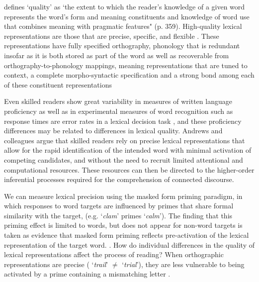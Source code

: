 \documentclass[review]{elsarticle}
\begin{document}
\citet{perfettiReadingAbilityLexical2007} defines `quality'  as `the extent to which the reader's knowledge of a given word represents the word's form and meaning constituents and knowledge of word use that combines meaning with pragmatic features" (p. 359). High-quality lexical representations are those that are  precise, specific, and flexible \citep{perfettiReadingAbilityLexical2007}.  These representations have fully specified orthography,  phonology that is redundant insofar as it is both stored as part of the word  as well as recoverable from orthography-to-phonology mappings, meaning representations that are tuned to context, a complete morpho-syntactic specification and a strong bond among each of these constituent representations \citep{perfettiLexicalQualityHypothesis2002, perfettiReadingAbilityLexical2007, perfettiLexicalQualityRevisited2017}
  
Even skilled readers show great variability in measures of written language proficiency as well as in experimental measures of word recognition such as response times are error rates in a lexical decision task \citep{andrewsIndividualDifferencesSkilled2012}, and these proficiency differences  may be related to differences in lexical quality.  Andrews and colleagues \citep{andrewsLexicalExpertiseReading2009, andrewsLexicalPrecisionSkilled2010, andrewsIndividualDifferencesSkilled2012, andrewsMorphologicalPrimingStronger2013}  argue that skilled readers rely on precise lexical representations that allow for the rapid identification of the intended word with minimal activation of competing candidates, and without the need to recruit limited attentional and computational resources.  These resources can then be directed to the higher-order inferential processes required for the comprehension of connected discourse.

We can measure lexical precision using the masked form priming paradigm, in which  responses to word targets are influenced by primes that share formal similarity with the target, (e.g. `\textit{clam}' primes `\textit{calm}').  The finding that this priming effect is limited to words, but does not appear for non-word targets is taken as evidence that masked form priming reflects pre-activation of the lexical representation of the target word. \citep{andrewsLexicalPrecisionSkilled2010,forsterRepetitionPrimingFrequency1984}.   How do individual differences in the quality of lexical representations affect the process of reading?  When orthographic representations are precise ( `\textit{trail}' $\neq$ `\textit{trial}'), they are less vulnerable to being activated by a prime containing a mismatching letter \citep{forsterBodiesAntibodiesNeighborhooddensity1994}.  
\end{document}
